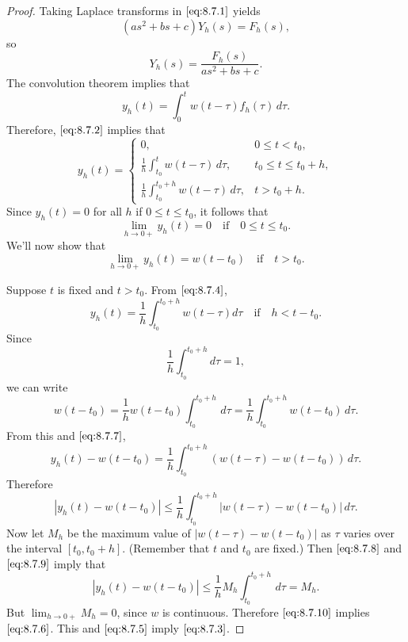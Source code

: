 \documentclass{ximera}
\begin{document}
\begin{proof}
Taking Laplace transforms in $\eqref{eq:8.7.1}$ yields
$$
(as^2+bs+c)Y_h(s)=F_h(s),
$$
so
$$
Y_h(s)=\frac{F_h(s)}{as^2+bs+c}.
$$
The convolution theorem implies that
$$
y_h(t)=\int_0^t w(t-\tau)f_h(\tau)\,d\tau.
$$
Therefore, $\eqref{eq:8.7.2}$ implies that
\begin{equation} \label{eq:8.7.4}
y_h(t)=\left\{\begin{array}{cl} 0,&0\leq t<t_0,\\
\frac{1}{h}\int_{t_0}^tw(t-\tau)\,d\tau,&t_0\leq t\leq
t_0+h,\\
\frac{1}{h}\int_{t_0}^{t_0+h}w(t-\tau)\,d\tau,&t>t_0+h.\end{array}\right.
\end{equation}
Since $y_h(t)=0$ for all $h$ if $0\leq t\leq t_0$, it follows that
\begin{equation} \label{eq:8.7.5}
\lim_{h\to0+}y_h(t)=0 \quad\mbox{if}\quad 0\leq t\leq t_0.
\end{equation}
We'll now show that
\begin{equation} \label{eq:8.7.6}
\lim_{h\rightarrow0+}y_h(t)=w(t-t_0)\quad\mbox{if}\quad t>t_0.
\end{equation}

Suppose   $t$ is fixed and $t>t_0$.
From
$\eqref{eq:8.7.4}$,
\begin{equation} \label{eq:8.7.7}
y_h(t)=\frac{1}{h}\int_{t_0}^{t_0+h}w(t-\tau)d\tau\quad\mbox{if}\quad
h<t-t_0.
\end{equation}
Since
\begin{equation} \label{eq:8.7.8}
\frac{1}{h}\int_{t_0}^{t_0+h}d\tau=1,
\end{equation}
we can write
$$
w(t-t_0)=\frac{1}{h}w(t-t_0)\int_{t_0}^{t_0+h}\,d\tau=
\frac{1}{h}\int_{t_0}^{t_0+h}w(t-t_0)\,d\tau.
$$
From this and $\eqref{eq:8.7.7}$,
$$
y_h(t)-w(t-t_0)=
\frac{1}{h}\int_{t_0}^{t_0+h}\left(w(t-\tau)-w(t-t_0)\right)\,d\tau.
$$
Therefore
\begin{equation} \label{eq:8.7.9}
|y_h(t)-w(t-t_0)|\leq
\frac{1}{h}\int_{t_0}^{t_0+h}|w(t-\tau)-w(t-t_0)|\,d\tau.
\end{equation}
Now let $M_h$ be the maximum value of $|w(t-\tau)-w(t-t_0)|$ as $\tau$
varies over the interval $[t_0,t_0+h]$. (Remember that $t$ and $t_0$
are fixed.) Then $\eqref{eq:8.7.8}$ and $\eqref{eq:8.7.9}$ imply that
\begin{equation} \label{eq:8.7.10}
|y_h(t)-w(t-t_0)|\leq
\frac{1}{h}M_h\int_{t_0}^{t_0+h}\,d\tau=M_h.
\end{equation}
But $\lim_{h\rightarrow0+}M_h=0$, since $w$ is continuous.
Therefore $\eqref{eq:8.7.10}$ implies $\eqref{eq:8.7.6}$.
This and $\eqref{eq:8.7.5}$ imply $\eqref{eq:8.7.3}$. 
\end{proof}
\end{document}
